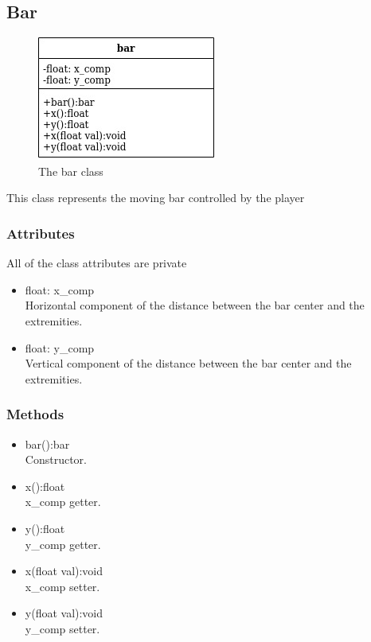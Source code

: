 \documentclass[]{article}
\begin{document}
\subsection{Bar}
\begin{figure}[h!]
    \centering
    \includegraphics[scale=0.5]{bar.jpg}
    \caption{The bar class}
    \label{fig:bar class diagram }
\end{figure}
This class represents the moving bar controlled by the player
\subsubsection{Attributes}
All of the class attributes are private
	\begin{itemize}
		\item float: x\_comp\\Horizontal component of the distance between the bar center and the extremities.
		\item float: y\_comp\\Vertical component of the distance between the bar center and the extremities.
	\end{itemize}
\subsubsection{Methods}
	\begin{itemize}
		\item bar():bar\\Constructor.
		\item x():float\\x\_comp getter.
		\item y():float\\y\_comp getter.
		\item x(float val):void\\x\_comp setter.
		\item y(float val):void\\y\_comp setter.
	\end{itemize}
\newpage
\end{document}
